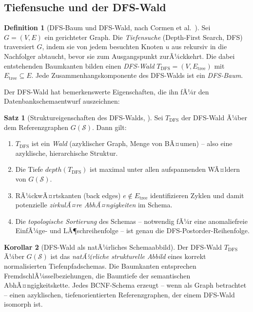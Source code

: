 ﻿\documentclass[a4paper,12pt]{report}
\theoremstyle{definition}
\newtheorem{definition}{Definition}[chapter]
\newtheorem{theorem}{Satz}[chapter]
\newtheorem{corollary}[theorem]{Korollar}
\theoremstyle{remark}
\newcommand{\depth}{\mathit{depth}}
\begin{document}
\subsection{Tiefensuche und der DFS-Wald}

\begin{definition}[DFS-Baum und DFS-Wald, nach Cormen et al.~\cite{Cormen2009}]
\label{def:dfswald}
Sei $G = (V, E)$ ein gerichteter Graph. Die \emph{Tiefensuche} (Depth-First
Search, DFS) traversiert $G$, indem sie von jedem besuchten Knoten $u$ aus
rekursiv in die Nachfolger abtaucht, bevor sie zum Ausgangspunkt zurÃ¼ckkehrt.
Die dabei entstehenden Baumkanten bilden einen \emph{DFS-Wald}
$T_{\mathrm{DFS}} = (V, E_{\mathrm{tree}})$ mit
$E_{\mathrm{tree}} \subseteq E$. Jede Zusammenhangskomponente des DFS-Walds
ist ein \emph{DFS-Baum}.
\end{definition}

Der DFS-Wald hat bemerkenswerte Eigenschaften, die ihn fÃ¼r den
Datenbankschemaentwurf auszeichnen:

\begin{theorem}[Struktureigenschaften des DFS-Walds, \cite{Cormen2009, Tarjan1972}]
\label{thm:dfswald}
Sei $T_{\mathrm{DFS}}$ der DFS-Wald Ã¼ber dem Referenzgraphen
$G(\mathcal{S})$. Dann gilt:
\begin{enumerate}[label=(\roman*)]
  \item $T_{\mathrm{DFS}}$ ist ein \emph{Wald} (azyklischer Graph, Menge
        von BÃ¤umen) -- also eine azyklische, hierarchische Struktur.
  \item Die Tiefe $\depth(T_{\mathrm{DFS}})$ ist maximal unter allen
        aufspannenden WÃ¤ldern von $G(\mathcal{S})$.
  \item RÃ¼ckwÃ¤rtskanten (back edges) $e \notin E_{\mathrm{tree}}$ identifizieren
        Zyklen und damit potenzielle \emph{zirkulÃ¤re AbhÃ¤ngigkeiten} im Schema.
  \item Die \emph{topologische Sortierung} des Schemas -- notwendig fÃ¼r
        eine anomaliefreie EinfÃ¼ge- und LÃ¶schreihenfolge -- ist
        genau die DFS-Postorder-Reihenfolge.
\end{enumerate}
\end{theorem}

\begin{corollary}[DFS-Wald als natÃ¼rliches Schemaabbild]
Der DFS-Wald $T_{\mathrm{DFS}}$ Ã¼ber $G(\mathcal{S})$ ist das
\emph{natÃ¼rliche strukturelle Abbild} eines korrekt normalisierten
Tiefenpfadschemas. Die Baumkanten entsprechen FremdschlÃ¼sselbeziehungen,
die Baumtiefe der semantischen AbhÃ¤ngigkeitskette.
Jedes BCNF-Schema erzeugt -- wenn als Graph betrachtet -- einen azyklischen,
tiefenorientierten Referenzgraphen, der einem DFS-Wald isomorph ist.
\end{corollary}
\end{document}
